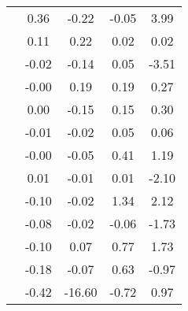 \begin{table}
\begin{tabular}{c|cc|cc|}
\multicolumn{1}{|c|}{} & \multicolumn{1}{|c|}{      0.36} & \multicolumn{1}{|c|}{     -0.22} & \multicolumn{1}{|c|}{     -0.05} & \multicolumn{1}{|c|}{      3.99} \\ 
\multicolumn{1}{|c|}{} & \multicolumn{1}{|c|}{      0.11} & \multicolumn{1}{|c|}{      0.22} & \multicolumn{1}{|c|}{      0.02} & \multicolumn{1}{|c|}{      0.02} \\ 
\multicolumn{1}{|c|}{} & \multicolumn{1}{|c|}{     -0.02} & \multicolumn{1}{|c|}{     -0.14} & \multicolumn{1}{|c|}{      0.05} & \multicolumn{1}{|c|}{     -3.51} \\ 
\multicolumn{1}{|c|}{} & \multicolumn{1}{|c|}{     -0.00} & \multicolumn{1}{|c|}{      0.19} & \multicolumn{1}{|c|}{      0.19} & \multicolumn{1}{|c|}{      0.27} \\ 
\multicolumn{1}{|c|}{} & \multicolumn{1}{|c|}{      0.00} & \multicolumn{1}{|c|}{     -0.15} & \multicolumn{1}{|c|}{      0.15} & \multicolumn{1}{|c|}{      0.30} \\ 
\multicolumn{1}{|c|}{} & \multicolumn{1}{|c|}{     -0.01} & \multicolumn{1}{|c|}{     -0.02} & \multicolumn{1}{|c|}{      0.05} & \multicolumn{1}{|c|}{      0.06} \\ 
\multicolumn{1}{|c|}{} & \multicolumn{1}{|c|}{     -0.00} & \multicolumn{1}{|c|}{     -0.05} & \multicolumn{1}{|c|}{      0.41} & \multicolumn{1}{|c|}{      1.19} \\ 
\multicolumn{1}{|c|}{} & \multicolumn{1}{|c|}{      0.01} & \multicolumn{1}{|c|}{     -0.01} & \multicolumn{1}{|c|}{      0.01} & \multicolumn{1}{|c|}{     -2.10} \\ 
\multicolumn{1}{|c|}{} & \multicolumn{1}{|c|}{     -0.10} & \multicolumn{1}{|c|}{     -0.02} & \multicolumn{1}{|c|}{      1.34} & \multicolumn{1}{|c|}{      2.12} \\ 
\multicolumn{1}{|c|}{} & \multicolumn{1}{|c|}{     -0.08} & \multicolumn{1}{|c|}{     -0.02} & \multicolumn{1}{|c|}{     -0.06} & \multicolumn{1}{|c|}{     -1.73} \\ 
\multicolumn{1}{|c|}{} & \multicolumn{1}{|c|}{     -0.10} & \multicolumn{1}{|c|}{      0.07} & \multicolumn{1}{|c|}{      0.77} & \multicolumn{1}{|c|}{      1.73} \\ 
\multicolumn{1}{|c|}{} & \multicolumn{1}{|c|}{     -0.18} & \multicolumn{1}{|c|}{     -0.07} & \multicolumn{1}{|c|}{      0.63} & \multicolumn{1}{|c|}{     -0.97} \\ 
\multicolumn{1}{|c|}{} & \multicolumn{1}{|c|}{     -0.42} & \multicolumn{1}{|c|}{    -16.60} & \multicolumn{1}{|c|}{     -0.72} & \multicolumn{1}{|c|}{      0.97} \\ 

\end{tabular}
\end{table}
